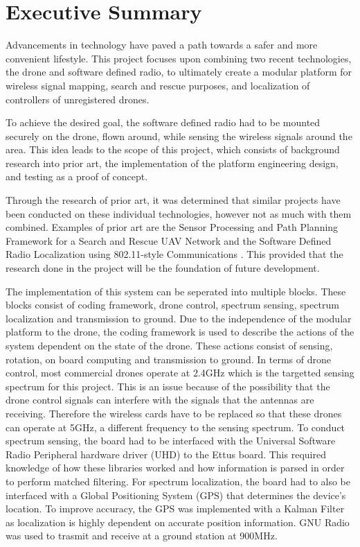 \chapter*{Executive Summary}
Advancements in technology have paved a path towards a safer and more convenient lifestyle. This project focuses upon combining two recent technologies, the drone and software defined radio, to ultimately create a modular platform for wireless signal mapping, search and rescue purposes, and localization of controllers of unregistered drones. \par

To achieve the desired goal, the software defined radio had to be mounted securely on the drone, flown around, while sensing the wireless signals around the area. This idea leads to the scope of this project, which consists of background research into prior art, the implementation of the platform engineering design, and testing as a proof of concept. \par

Through the research of prior art, it was determined that similar projects have been conducted on these individual technologies, however not as much with them combined. Examples of prior art are the Sensor Processing and Path Planning Framework for a Search and Rescue UAV Network \cite{path_planning_snr_mqp} and the Software Defined Radio Localization using 802.11-style Communications \cite{sdr_localization_mqp}. This provided that the research done in the project will be the foundation of future development. \par

The implementation of this system can be seperated into multiple blocks. These blocks consist of coding framework, drone control, spectrum sensing, spectrum localization and transmission to ground. Due to the independence of the modular platform to the drone, the coding framework is used to describe the actions of the system dependent on the state of the drone. These actions consist of sensing, rotation, on board computing and transmission to ground. In terms of drone control, most commercial drones operate at 2.4GHz which is the targetted sensing spectrum for this project. This is an issue because of the possibility that the drone control signals can interfere with the signals that the antennas are receiving. Therefore the wireless cards have to be replaced so that these drones can operate at 5GHz, a different frequency to the sensing spectrum. To conduct spectrum sensing, the board had to be interfaced with the Universal Software Radio Peripheral hardware driver (UHD) to the Ettus board. This required knowledge of how these libraries worked and how information is parsed in order to perform matched filtering. For spectrum localization, the board had to also be interfaced with a Global Positioning System (GPS) that determines the device's location. To improve accuracy, the GPS was implemented with a Kalman Filter as localization is highly dependent on accurate position information. GNU Radio was used to trasmit and receive at a ground station at 900MHz. \par

